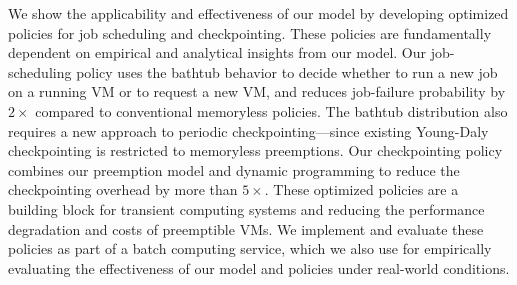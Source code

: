 We show the applicability and effectiveness of our model by developing optimized policies for job scheduling and checkpointing. 
These policies are fundamentally dependent on empirical and analytical insights from our model. %
%
Our job-scheduling policy uses the bathtub behavior to decide whether to run a new job on a running VM or to request a new VM, and reduces job-failure probability by $2\times$ compared to  conventional memoryless policies. 
%
The bathtub distribution also requires a new approach to periodic checkpointing---since existing Young-Daly~\cite{daly2006higher} checkpointing is restricted to memoryless preemptions. 
%
Our checkpointing policy combines our preemption model and dynamic programming to reduce the checkpointing overhead by more than $5\times$. 
%
These optimized policies are a building block for transient computing systems and reducing the performance degradation and costs of preemptible VMs. 
We implement and evaluate these policies as part of a batch computing service, which we also use for empirically evaluating the effectiveness of our model and policies under real-world conditions. 





